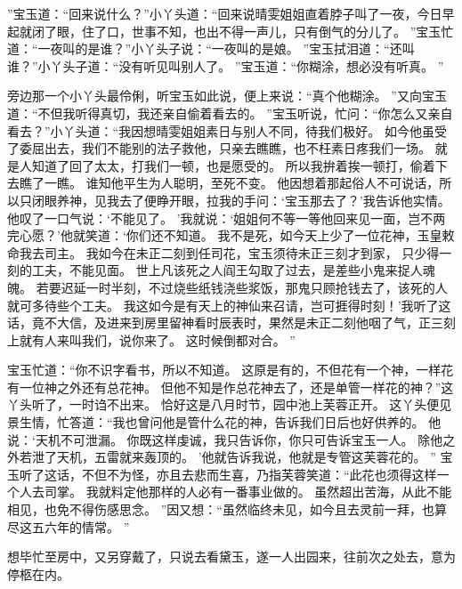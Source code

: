 ”宝玉道：“回来说什么？”小丫头道：“回来说晴雯姐姐直着脖子叫了一夜，今日早起就闭了眼，住了口，世事不知，也出不得一声儿，只有倒气的分儿了。
”宝玉忙道：“一夜叫的是谁？”小丫头子说：“一夜叫的是娘。
”宝玉拭泪道：“还叫谁？”小丫头子道：“没有听见叫别人了。
”宝玉道：“你糊涂，想必没有听真。
”\par
旁边那一个小丫头最伶俐，听宝玉如此说，便上来说：“真个他糊涂。
”又向宝玉道：“不但我听得真切，我还亲自偷着看去的。
”宝玉听说，忙问：“你怎么又亲自看去？”小丫头道：“我因想晴雯姐姐素日与别人不同，待我们极好。
如今他虽受了委屈出去，我们不能别的法子救他，只亲去瞧瞧，也不枉素日疼我们一场。
就是人知道了回了太太，打我们一顿，也是愿受的。
所以我拚着挨一顿打，偷着下去瞧了一瞧。
谁知他平生为人聪明，至死不变。
他因想着那起俗人不可说话，所以只闭眼养神，见我去了便睁开眼，拉我的手问：‘宝玉那去了？’我告诉他实情。
他叹了一口气说：‘不能见了。
’我就说：‘姐姐何不等一等他回来见一面，岂不两完心愿？’他就笑道：‘你们还不知道。
我不是死，如今天上少了一位花神，玉皇敕命我去司主。
我如今在未正二刻到任司花，宝玉须待未正三刻才到家，
只少得一刻的工夫，不能见面。
世上凡该死之人阎王勾取了过去，是差些小鬼来捉人魂魄。
若要迟延一时半刻，不过烧些纸钱浇些浆饭，那鬼只顾抢钱去了，该死的人就可多待些个工夫。
我这如今是有天上的神仙来召请，岂可捱得时刻！’我听了这话，竟不大信，及进来到房里留神看时辰表时，果然是未正二刻他咽了气，正三刻上就有人来叫我们，说你来了。
这时候倒都对合。
”\par
宝玉忙道：“你不识字看书，所以不知道。
这原是有的，不但花有一个神，一样花有一位神之外还有总花神。
但他不知是作总花神去了，还是单管一样花的神？”这丫头听了，一时诌不出来。
恰好这是八月时节，园中池上芙蓉正开。
这丫头便见景生情，忙答道：“我也曾问他是管什么花的神，告诉我们日后也好供养的。
他说：‘天机不可泄漏。
你既这样虔诚，我只告诉你，你只可告诉宝玉一人。
除他之外若泄了天机，五雷就来轰顶的。
’他就告诉我说，他就是专管这芙蓉花的。
”
宝玉听了这话，不但不为怪，亦且去悲而生喜，乃指芙蓉笑道：“此花也须得这样一个人去司掌。
我就料定他那样的人必有一番事业做的。
虽然超出苦海，从此不能相见，也免不得伤感思念。
”因又想：“虽然临终未见，如今且去灵前一拜，也算尽这五六年的情常。
”\par
想毕忙至房中，又另穿戴了，只说去看黛玉，遂一人出园来，往前次之处去，意为停柩在内。
